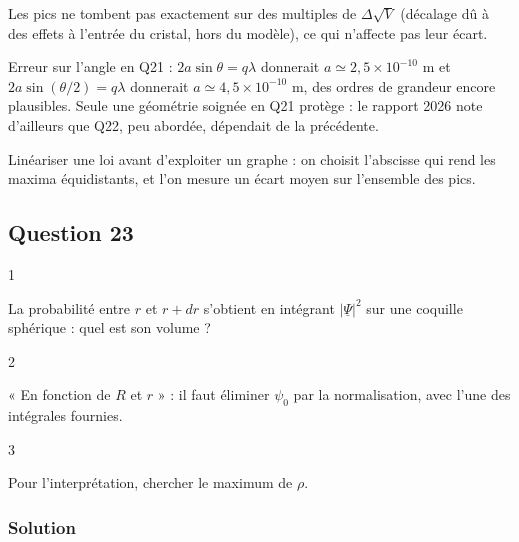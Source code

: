 \documentclass[11pt,a4paper]{article}
\begin{document}
Les pics ne tombent pas exactement sur des multiples de \(\Delta\sqrt V\) (décalage dû à des effets à l'entrée du cristal, hors du modèle), ce qui n'affecte pas leur écart.

\begin{piege}

Erreur sur l'angle en Q21 : \(2a\sin\theta=q\lambda\) donnerait \(a\simeq2{,}5\times10^{-10}\) m et \(2a\sin(\theta/2)=q\lambda\) donnerait \(a\simeq4{,}5\times10^{-10}\) m, des ordres de grandeur encore plausibles. Seule une géométrie soignée en Q21 protège : le rapport 2026 note d'ailleurs que Q22, peu abordée, dépendait de la précédente.

\end{piege}

\begin{methode}

Linéariser une loi avant d'exploiter un graphe : on choisit l'abscisse qui rend les maxima équidistants, et l'on mesure un écart moyen sur l'ensemble des pics.

\end{methode}

\hypertarget{question-23}{%
\subsection{Question 23}\label{question-23}}

\begin{indication}{1}

La probabilité entre \(r\) et \(r+dr\) s'obtient en intégrant \(|\underline\Psi|^2\) sur une coquille sphérique : quel est son volume ?

\end{indication}

\begin{indication}{2}

« En fonction de \(R\) et \(r\) » : il faut éliminer \(\psi_0\) par la normalisation, avec l'une des intégrales fournies.

\end{indication}

\begin{indication}{3}

Pour l'interprétation, chercher le maximum de \(\rho\).

\end{indication}

\hypertarget{solution-22}{%
\subsubsection{Solution}\label{solution-22}}
\end{document}
